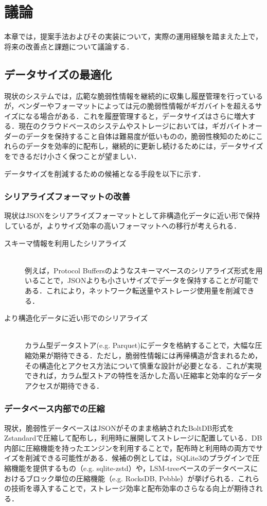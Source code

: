 \section{議論}

本章では，提案手法およびその実装について，実際の運用経験を踏まえた上で，将来の改善点と課題について議論する．

\subsection{データサイズの最適化}
現状のシステムでは，広範な脆弱性情報を継続的に収集し履歴管理を行っているが，ベンダーやフォーマットによっては元の脆弱性情報がギガバイトを超えるサイズになる場合がある．これを履歴管理すると，データサイズはさらに増大する．現在のクラウドベースのシステムやストレージにおいては，ギガバイトオーダーのデータを保持すること自体は難易度が低いものの，脆弱性検知のためにこれらのデータを効率的に配布し，継続的に更新し続けるためには，データサイズをできるだけ小さく保つことが望ましい．

データサイズを削減するための候補となる手段を以下に示す．

\subsubsection{シリアライズフォーマットの改善}

現状はJSONをシリアライズフォーマットとして非構造化データに近い形で保持しているが，よりサイズ効率の高いフォーマットへの移行が考えられる．

\begin{description}
  \item[スキーマ情報を利用したシリアライズ] \mbox{} \\
    例えば，Protocol Buffersのようなスキーマベースのシリアライズ形式を用いることで，JSONよりも小さいサイズでデータを保持することが可能である．これにより，ネットワーク転送量やストレージ使用量を削減できる．
  \item[より構造化データに近い形でのシリアライズ] \mbox{} \\
    カラム型データストア(e.g. Parquet\cite{parquet})にデータを格納することで，大幅な圧縮効果が期待できる．ただし，脆弱性情報には再帰構造が含まれるため，その構造化とアクセス方法について慎重な設計が必要となる．これが実現できれば，カラム型ストアの特性を活かした高い圧縮率と効率的なデータアクセスが期待できる．
\end{description}

\subsubsection{データベース内部での圧縮}
現状，脆弱性データベースはJSONがそのまま格納されたBoltDB形式をZstandardで圧縮して配布し，利用時に展開してストレージに配置している．DB内部に圧縮機能を持ったエンジンを利用することで，配布時と利用時の両方でサイズを削減できる可能性がある．候補の例としては，SQLite3のプラグインで圧縮機能を提供するもの（e.g. sqlite-zstd\cite{sqlite-zstd}）や，LSM-treeベースのデータベースにおけるブロック単位の圧縮機能（e.g. RocksDB\cite{rocksdb}, Pebble\cite{pebble}）が挙げられる．これらの技術を導入することで，ストレージ効率と配布効率のさらなる向上が期待される．

